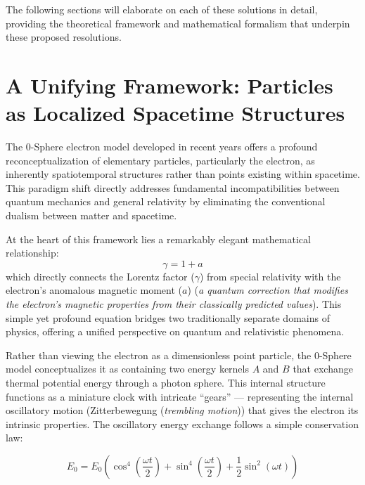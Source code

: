 \documentclass[12pt,letterpaper]{article} %
\begin{document}
The following sections will elaborate on each of these solutions in detail, providing the theoretical framework and mathematical formalism that underpin these proposed resolutions.


\section{A Unifying Framework: Particles as Localized Spacetime Structures}

The 0-Sphere electron model developed in recent years offers a profound reconceptualization of elementary particles, particularly the electron, as inherently spatiotemporal structures rather than points existing within spacetime\cite{hanamura2020}. This paradigm shift directly addresses fundamental incompatibilities between quantum mechanics and general relativity by eliminating the conventional dualism between matter and spacetime.

At the heart of this framework lies a remarkably elegant mathematical relationship:
\begin{equation}
\gamma = 1 + a
\end{equation}
which directly connects the Lorentz factor ($\gamma$) from special relativity with the electron's anomalous magnetic moment ($a$) (\textit{a quantum correction that modifies the electron's magnetic properties from their classically predicted values})\cite{hanamura2025}. This simple yet profound equation bridges two traditionally separate domains of physics, offering a unified perspective on quantum and relativistic phenomena.

Rather than viewing the electron as a dimensionless point particle, the 0-Sphere model conceptualizes it as containing two energy kernels $A$ and $B$ that exchange thermal potential energy through a photon sphere\cite{hanamura2018}. This internal structure functions as a miniature clock with intricate ``gears'' --- representing the internal oscillatory motion (Zitterbewegung (\textit{trembling motion})) that gives the electron its intrinsic properties\cite{schrodinger1930}. The oscillatory energy exchange follows a simple conservation law:

\begin{equation}
E_0 = E_0 \left( \cos^4 \left( \frac{\omega t}{2} \right) + \sin^4 \left( \frac{\omega t}{2} \right) + \frac{1}{2} \sin^2 (\omega t) \right)
\label{eq:energy_conservation}
\end{equation}
\end{document}
